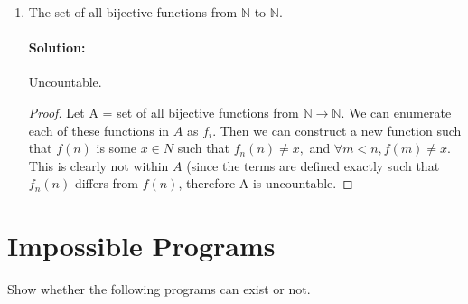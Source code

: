 \documentclass[11pt, notitlepage]{report}
\newcommand{\N}{\mathbb{N}}
\newcommand{\Question}[1]{\newpage\section{#1}}
\newenvironment{solution}{\paragraph{Solution:}}{\hfill}
\begin{document}
\begin{enumerate}[label=\alph*.)]
	\newpage
	
    \item The set of all bijective functions from $\N$ to $\N$.
    \begin{solution} Uncountable.
    \begin{proof}
    	Let A = set of all bijective functions from $\N \rightarrow \N$. We can enumerate each of these functions in $A$ as $f_i$. Then we can construct a new function such that $f(n)$ is some $x\in N$ such that $f_n(n) \not = x,$ and $\forall m < n, f(m) \not = x. $ This is clearly not within $A$ (since the terms are defined exactly such that $f_n(n)$ differs from $f(n)$, therefore A is uncountable.
    \end{proof}
    \end{solution}
\end{enumerate}



\Question{Impossible Programs}

Show whether the following programs can exist or not.
\end{document}
